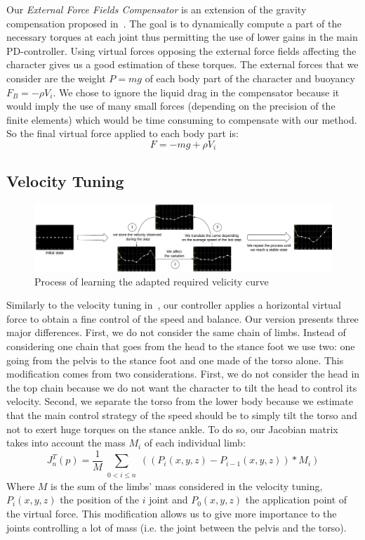 \documentclass[conference]{acmsiggraph}
\begin{document}
Our \textit{External Force Fields Compensator} is an extension of the gravity compensation proposed in~\cite{coros2010generalized}. The goal is to dynamically compute a part of the necessary torques at each joint thus permitting the use of lower gains in the main PD-controller. Using virtual forces opposing the external force fields affecting the character gives us a good estimation of these torques. The external forces that we consider are the weight $P=mg$ of each body part of the character and buoyancy $F_B=-\rho V_i$. We chose to ignore the liquid drag in the compensator because it would imply the use of many small forces (depending on the precision of the finite elements) which would be time consuming to compensate with our method. So the final virtual force applied to each body part is:
$$
F=-mg+\rho V_i
$$

\subsection{Velocity Tuning}
\label{sec:speed_virt_force}

\begin{figure}[t]
\centering
\includegraphics[scale=0.35]{images/speed_curve_learner.pdf}
\caption{Process of learning the adapted required velicity curve}
\label{fig:speed_curve_learner}
\end{figure}

Similarly to the velocity tuning in~\cite{coros2010generalized}, our controller applies a horizontal virtual force to obtain a fine control of the speed and balance. Our version presents three major differences. First, we do not consider the same chain of limbs. Instead of considering one chain that goes from the head to the stance foot we use two: one going from the pelvis to the stance foot and one made of the torso alone. This modification comes from two considerations. First, we do not consider the head in the top chain because we do not want the character to tilt the head to control its velocity. Second, we separate the torso from the lower body because we estimate that the main control strategy of the speed should be to simply tilt the torso and not to exert huge torques on the stance ankle. To do so, our Jacobian matrix takes into account the mass $M_i$ of each individual limb:
$$
J_n ^T (p)=\frac{1}{M}\sum_{\substack{0<i\leq n}} ((P_i(x,y,z)-P_{i-1}(x,y,z))*M_i)
$$
Where $M$ is the sum of the limbs' mass considered in the velocity tuning, $P_i(x,y,z)$ the position of the $i$ joint and $P_0(x,y,z)$ the application point of the virtual force. This modification allows us to give more importance to the joints controlling a lot of mass (i.e. the joint between the pelvis and the torso).
\end{document}
